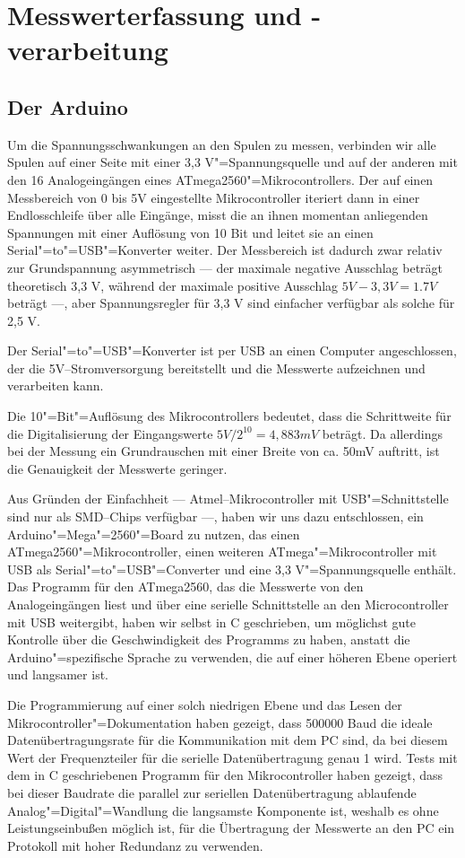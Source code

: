 \section{Messwerterfassung und -verarbeitung}

\subsection{Der Arduino}

Um die Spannungsschwankungen an den Spulen zu messen,
verbinden wir alle Spulen auf einer Seite mit einer 3,3 V"=Spannungsquelle und auf der
anderen mit den 16 Analogeingängen eines ATmega2560"=Mikrocontrollers. Der auf einen
Messbereich von 0 bis 5V eingestellte Mikrocontroller iteriert dann in einer Endlosschleife
über alle Eingänge, misst die an ihnen momentan anliegenden Spannungen mit einer
Auflösung von 10 Bit und leitet sie an einen Serial"=to"=USB"=Konverter weiter. Der Messbereich
ist dadurch zwar relativ zur Grundspannung asymmetrisch --- der maximale negative Ausschlag beträgt
theoretisch 3,3 V, während der maximale positive Ausschlag $ 5V - 3,3 V = 1.7 V $ beträgt ---, aber
Spannungsregler für 3,3 V sind einfacher verfügbar als solche für 2,5 V.

Der Serial"=to"=USB"=Konverter ist per USB an einen Computer angeschlossen, der die 5V--Stromversorgung
bereitstellt und die Messwerte aufzeichnen und verarbeiten kann.

Die 10"=Bit"=Auflösung des Mikrocontrollers bedeutet, dass die Schrittweite für die Digitalisierung
der Eingangswerte $ 5 V / 2^{10} = 4,883 mV $ beträgt. Da allerdings bei der Messung ein
Grundrauschen mit einer Breite von ca. 50mV auftritt, ist die Genauigkeit der Messwerte geringer.

Aus Gründen der Einfachheit --- Atmel--Mikrocontroller mit USB"=Schnittstelle sind nur als SMD--Chips
verfügbar ---, haben wir uns dazu entschlossen, ein Arduino"=Mega"=2560"=Board zu nutzen, das einen
ATmega2560"=Mikrocontroller, einen weiteren ATmega"=Mikrocontroller mit USB als Serial"=to"=USB"=Converter und eine 
3,3 V"=Spannungsquelle enthält. Das Programm für den ATmega2560, das die Messwerte von den
Analogeingängen liest und über eine serielle Schnittstelle an den Microcontroller mit USB weitergibt, haben
wir selbst in C geschrieben, um möglichst gute Kontrolle über die Geschwindigkeit des Programms
zu haben, anstatt die Arduino"=spezifische Sprache zu verwenden, die auf
einer höheren Ebene operiert und langsamer ist.

Die Programmierung auf einer solch niedrigen Ebene und das Lesen der Mikrocontroller"=Dokumentation
haben gezeigt, dass 500000 Baud die ideale Datenübertragungsrate für die Kommunikation mit dem PC
sind, da bei diesem Wert der Frequenzteiler für die serielle Datenübertragung genau 1 wird.
Tests mit dem in C geschriebenen Programm für den Mikrocontroller haben gezeigt, dass bei
dieser Baudrate die
parallel zur seriellen Datenübertragung ablaufende Analog"=Digital"=Wandlung die langsamste
Komponente ist, weshalb es ohne Leistungseinbußen möglich ist, für die Übertragung
der Messwerte an den PC ein Protokoll mit hoher Redundanz zu verwenden.

